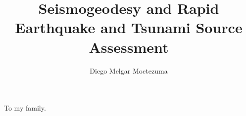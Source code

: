 
\title{Seismogeodesy and Rapid Earthquake and Tsunami Source Assessment}

\author{Diego Melgar Moctezuma}


%
\begin{frontmatter}

%
%
\makefrontmatter 

%
%   
%
%
%
%
\begin{dedication} 
  To my family.
\end{dedication}


%   
% 



%
%
%


\end{frontmatter}
